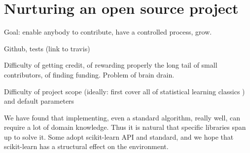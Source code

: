 \documentclass{article}
\begin{document}
\section{Nurturing an open source project}

Goal: enable anybody to contribute, have a controlled process, grow.

Github, tests (link to travis)

Difficulty of getting credit, of rewarding properly the long tail of small
contributors, of finding funding. Problem of brain drain.

Difficulty of project scope (ideally: first cover all of statistical
learning classics \cite{elemstatlearn}) and default parameters

We have found that implementing, even a standard algorithm, really well,
can require a lot of domain knowledge. Thus it is natural that specific
libraries span up to solve it. Some adopt scikit-learn API and standard,
and we hope that scikit-learn has a structural effect on the environment.

\small


\end{document}
